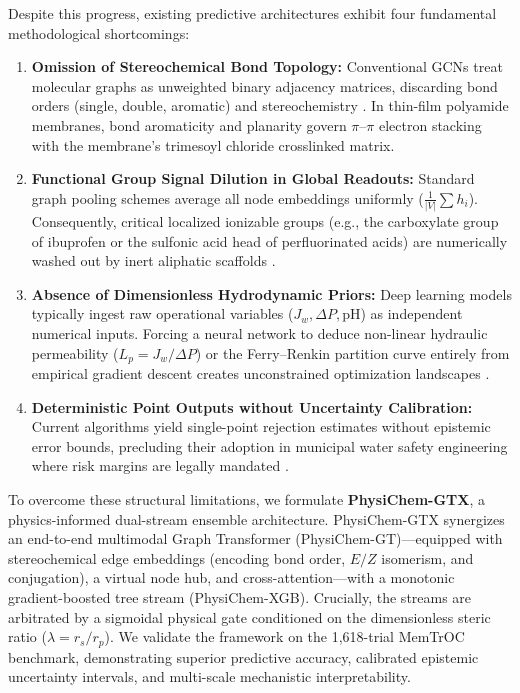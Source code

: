 \documentclass[10pt,twocolumn]{article}
\begin{document}
Despite this progress, existing predictive architectures exhibit four fundamental methodological shortcomings:
\begin{enumerate}[leftmargin=1.3em,itemsep=2pt,topsep=3pt]
\item \textbf{Omission of Stereochemical Bond Topology:} Conventional GCNs treat molecular graphs as unweighted binary adjacency matrices, discarding bond orders (single, double, aromatic) and stereochemistry \cite{kipf2017,hu2020}. In thin-film polyamide membranes, bond aromaticity and planarity govern $\pi$--$\pi$ electron stacking with the membrane's trimesoyl chloride crosslinked matrix.
\item \textbf{Functional Group Signal Dilution in Global Readouts:} Standard graph pooling schemes average all node embeddings uniformly ($\frac{1}{|V|}\sum h_i$). Consequently, critical localized ionizable groups (e.g., the carboxylate group of ibuprofen or the sulfonic acid head of perfluorinated acids) are numerically washed out by inert aliphatic scaffolds \cite{xu2019}.
\item \textbf{Absence of Dimensionless Hydrodynamic Priors:} Deep learning models typically ingest raw operational variables ($J_w, \Delta P, \mathrm{pH}$) as independent numerical inputs. Forcing a neural network to deduce non-linear hydraulic permeability ($L_p = J_w/\Delta P$) or the Ferry--Renkin partition curve entirely from empirical gradient descent creates unconstrained optimization landscapes \cite{karniadakis2021}.
\item \textbf{Deterministic Point Outputs without Uncertainty Calibration:} Current algorithms yield single-point rejection estimates without epistemic error bounds, precluding their adoption in municipal water safety engineering where risk margins are legally mandated \cite{gal2016}.
\end{enumerate}

To overcome these structural limitations, we formulate \textbf{PhysiChem-GTX}, a physics-informed dual-stream ensemble architecture. PhysiChem-GTX synergizes an end-to-end multimodal Graph Transformer (PhysiChem-GT)---equipped with stereochemical edge embeddings (encoding bond order, $E/Z$ isomerism, and conjugation), a virtual node hub, and cross-attention---with a monotonic gradient-boosted tree stream (PhysiChem-XGB). Crucially, the streams are arbitrated by a sigmoidal physical gate conditioned on the dimensionless steric ratio ($\lambda = r_s/r_p$). We validate the framework on the 1,618-trial MemTrOC benchmark, demonstrating superior predictive accuracy, calibrated epistemic uncertainty intervals, and multi-scale mechanistic interpretability.
\end{document}
